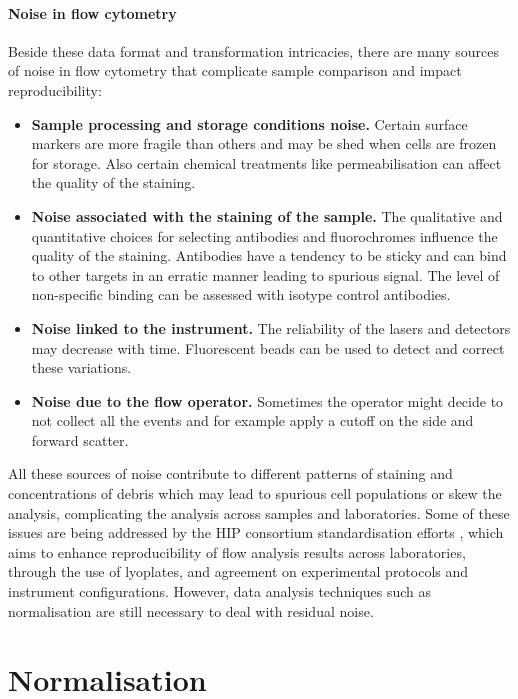 \clearpage


\paragraph{Noise in flow cytometry} 
Beside these data format and transformation intricacies, there are many sources of noise in flow cytometry that complicate sample comparison and impact reproducibility:
\begin{itemize}
  \item \textbf{Sample processing and storage conditions noise.}
    Certain surface markers are more fragile than others and may be shed when cells are frozen for storage.
    Also certain chemical treatments like permeabilisation can affect the quality of the staining.
  \item \textbf{Noise associated with the staining of the sample.}
    The qualitative and quantitative choices for selecting antibodies and fluorochromes influence the quality of the staining.
    Antibodies have a tendency to be sticky and can bind to other targets in an erratic manner leading to spurious signal.
    The level of non-specific binding can be assessed with isotype control antibodies.  
  \item \textbf{Noise linked to the instrument.}
    The reliability of the lasers and detectors may decrease with time.
    Fluorescent beads can be used to detect and correct these variations.  
  \item \textbf{Noise due to the flow operator.}
    Sometimes the operator might decide to not collect all the events and for example apply a cutoff on the side and forward scatter.
\end{itemize}
All these sources of noise contribute to different patterns of staining and concentrations of debris
which may lead to spurious cell populations or skew the analysis, complicating the analysis across samples and laboratories.
Some of these issues are being addressed by the \gls{HIP} consortium standardisation efforts \citep{Maecker:2012gl},
which aims to enhance reproducibility of flow analysis results across laboratories,
through the use of lyoplates, and agreement on experimental protocols and instrument configurations.
However, data analysis techniques such as normalisation are still necessary to deal with residual noise.

\section{Normalisation}

